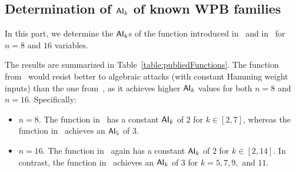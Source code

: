 \documentclass[11pt]{llncs}
\begin{document}
\subsection{Determination of $\mathsf{AI}_{k}$ of known WPB families}

In this part, we determine the $\mathsf{AI}_{k}$s of the function introduced in~\cite{Mat:ZJZQ23} and in~\cite{AMC:DalMal23} for $n=8$ and $16$ variables.

The results are summarized in Table~\ref{table:publiedFunctions}. 
The function from~\cite{AMC:DalMal23} would resist better to algebraic attacks (with constant Hamming weight inputs) than the one from~\cite{Mat:ZJZQ23}, as it achieves higher $\mathsf{AI}_{k}$ values for both $n = 8$ and $ n = 16$. Specifically:
\begin{itemize}
\item $n=8$. 
The function in~\cite{Mat:ZJZQ23} has a constant $\mathsf{AI}_{k}$ of $2$ for $k \in [2, 7]$, whereas the function in~\cite{AMC:DalMal23} achieves an $\mathsf{AI}_{5}$ of $3$.

\item $n=16$. 
The function in~\cite{Mat:ZJZQ23} again has a constant $\mathsf{AI}_{k}$ of $2$ for $k \in [2, 14]$. 
In contrast, the function in~\cite{AMC:DalMal23} achieves an $\mathsf{AI}_{k}$ of $3$ for $k = 5, 7, 9,$ and $11$.
\end{itemize}
\end{document}
